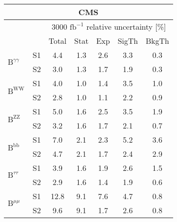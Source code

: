 \begin{tabular}{@{} l c c@{\hskip 0.15in} c c c c @{}}
 \hline
   \multicolumn{7}{c}{CMS}\\
 \hline
  &  & \multicolumn{5}{c}{3000 $\text{fb}^{-1}$ relative uncertainty [\%]} \\
  &  & Total & Stat & Exp & SigTh & BkgTh \\
 \hline
\multirow{2}{*}{$\mathrm{B}^{\gamma\gamma}$} & S1  & 4.4& 1.3 & 2.6 & 3.3 & 0.3  \\[1pt]
                        & S2  & 3.0& 1.3 & 1.7 & 1.9 & 0.3  \\[4pt]
\multirow{2}{*}{$\mathrm{B}^{\mathrm{WW}}$} & S1  & 4.0& 1.0 & 1.4 & 3.5 & 1.0  \\[1pt]
                        & S2  & 2.8& 1.0 & 1.1 & 2.2 & 0.9  \\[4pt]
\multirow{2}{*}{$\mathrm{B}^{\mathrm{ZZ}}$} & S1  & 5.0& 1.6 & 2.5 & 3.5 & 1.9  \\[1pt]
                        & S2  & 3.2& 1.6 & 1.7 & 2.1 & 0.7  \\[4pt]
\multirow{2}{*}{$\mathrm{B}^{\mathrm{bb}}$} & S1  & 7.0& 2.1 & 2.3 & 5.2 & 3.6  \\[1pt]
                        & S2  & 4.7& 2.1 & 1.7 & 2.4 & 2.9  \\[4pt]
\multirow{2}{*}{$\mathrm{B}^{\tau\tau }$} & S1  & 3.9& 1.6 & 1.9 & 2.6 & 1.5  \\[1pt]
                        & S2  & 2.9& 1.6 & 1.4 & 1.9 & 0.6  \\[4pt]
\multirow{2}{*}{$\mathrm{B}^{\mu\mu}$} & S1  & 12.8& 9.1 & 7.6 & 4.7 & 0.8  \\[1pt]
                        & S2  & 9.6& 9.1 & 1.7 & 2.6 & 0.8  \\[4pt]
\hline
\end{tabular}